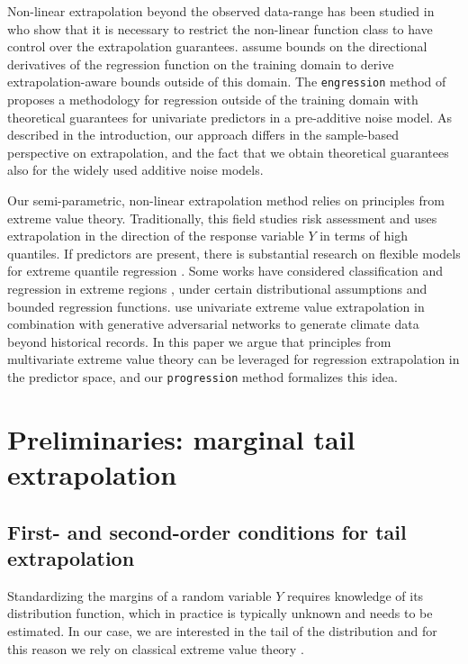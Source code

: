 \documentclass{statsoc}
\theoremstyle{break}
\begin{document}
Non-linear extrapolation beyond the observed data-range has been studied in  \citep{dong:ma:2023} who show that it is necessary to restrict the non-linear function class to have control over the extrapolation guarantees. 
\cite{pfister:buhlman:2023} assume bounds on the directional derivatives of the regression function on the training domain to derive extrapolation-aware bounds outside of this domain. The \texttt{engression} method of \cite{shen:meinshausen:2023} proposes a methodology for regression outside of the training domain with theoretical guarantees for univariate predictors in a pre-additive noise model. As described in the introduction, our approach differs in the sample-based perspective on extrapolation, and the fact that we obtain theoretical guarantees also for the widely used additive noise models.

Our semi-parametric, non-linear extrapolation method relies on principles from extreme value theory. Traditionally, this field studies risk assessment and uses extrapolation in the direction of the response variable $Y$ in terms of high quantiles. If predictors are present, there is substantial research on flexible models for extreme quantile regression \citep{ExGAM2,Kohfireboosting, gbex, gne2024, Pasche2025}.
Some works have considered classification \cite{jalalzai:clemencon:sabourin:2018} and regression in extreme regions \cite{huet2024regressionextremeregions}, under certain distributional assumptions and bounded regression functions.
\cite{bou2022} use univariate extreme value extrapolation in combination with generative adversarial networks to generate climate data beyond historical records.
In this paper we argue that principles from multivariate extreme value theory can be leveraged for regression extrapolation in the predictor space, and our \texttt{progression} method formalizes this idea. 








\section{Preliminaries: marginal tail extrapolation}\label{sec:prelim}

\subsection{First- and second-order conditions for tail extrapolation}
\label{sec:first_order}
Standardizing the margins of a random variable $Y$ requires knowledge of its distribution function, 
which in practice is typically unknown and needs to be estimated. 
In our case, we are interested in the tail of the distribution and for this reason we rely on classical extreme value theory \citep[][]{dehaan:ferreira:2006}. 
\end{document}

